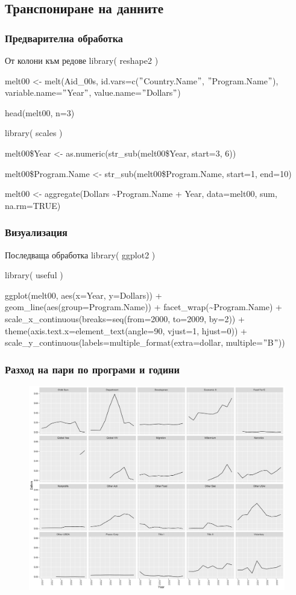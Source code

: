 \documentclass{beamer}
\begin{document}
\subsection{Транспониране на данните}

\begin{frame}
\frametitle{Предварителна обработка}
\begin{block}{От колони към редове}
library( reshape2 )

melt00 <- melt(Aid\_00s, id.vars=c($"$Country.Name$"$, $"$Program.Name$"$), variable.name=$"$Year$"$, value.name=$"$Dollars$"$)

head(melt00, n=3)

library( scales )

melt00\$Year <- as.numeric(str\_sub(melt00\$Year, start=3, 6))

melt00\$Program.Name <- str\_sub(melt00\$Program.Name, start=1, end=10)

melt00 <- aggregate(Dollars \textasciitilde Program.Name + Year, data=melt00, sum, na.rm=TRUE)
\end{block}
\end{frame}

\begin{frame}
\frametitle{Визуализация}
\begin{block}{Последваща обработка}
library( ggplot2 )

library( useful )

ggplot(melt00, aes(x=Year, y=Dollars)) + geom\_line(aes(group=Program.Name)) + facet\_wrap(\textasciitilde  Program.Name) + scale\_x\_continuous(breaks=seq(from=2000, to=2009, by=2)) + theme(axis.text.x=element\_text(angle=90, vjust=1, hjust=0)) + scale\_y\_continuous(labels=multiple\_format(extra=dollar, multiple=$"$B$"$))
\end{block}
\end{frame}

\begin{frame}
\frametitle{Разход на пари по програми и години}
\begin{figure}[]\includegraphics[width=\textwidth,height=0.75\textheight]{pic0029}\end{figure}
\end{frame}
\end{document}
